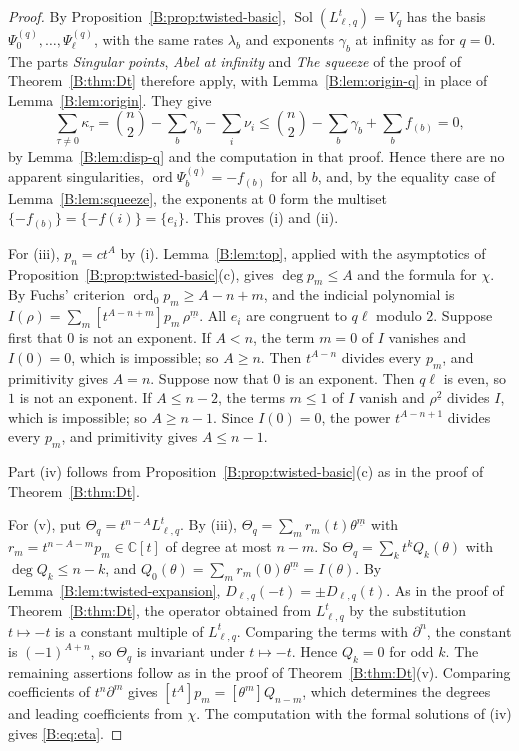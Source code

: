 \documentclass[11pt,a4paper]{article}
\theoremstyle{definition}
\theoremstyle{remark}
\newcommand{\C}{\mathbb C}
\newcommand{\ff}[2]{#1^{\underline{#2}}}
\DeclareMathOperator{\ord}{ord}
\DeclareMathOperator{\Sol}{Sol}
\numberwithin{equation}{section}
\begin{document}
\begin{proof}
By Proposition~\ref{B:prop:twisted-basic}, $\Sol(L^t_{\ell,q})=V_q$ has the basis $\Psi^{(q)}_0,\dots,\Psi^{(q)}_\ell$, with the same rates $\lambda_b$ and exponents $\gamma_b$ at infinity as for $q=0$. The parts \emph{Singular points}, \emph{Abel at infinity} and \emph{The squeeze} of the proof of Theorem~\ref{B:thm:Dt} therefore apply, with Lemma~\ref{B:lem:origin-q} in place of Lemma~\ref{B:lem:origin}. They give
\[
\sum_{\tau\ne0}\kappa_\tau=\binom n2-\sum_b\gamma_b-\sum_i\nu_i\le\binom n2-\sum_b\gamma_b+\sum_bf_{(b)}=0,
\]
by Lemma~\ref{B:lem:disp-q} and the computation in that proof. Hence there are no apparent singularities, $\ord\Psi^{(q)}_b=-f_{(b)}$ for all $b$, and, by the equality case of Lemma~\ref{B:lem:squeeze}, the exponents at $0$ form the multiset $\{-f_{(b)}\}=\{-f(i)\}=\{e_i\}$. This proves (i) and (ii).

For (iii), $p_n=ct^A$ by (i). Lemma~\ref{B:lem:top}, applied with the asymptotics of Proposition~\ref{B:prop:twisted-basic}(c), gives $\deg p_m\le A$ and the formula for $\chi$. By Fuchs' criterion $\ord_0p_m\ge A-n+m$, and the indicial polynomial is $I(\rho)=\sum_m[t^{A-n+m}]p_m\,\ff{\rho}{m}$. All $e_i$ are congruent to $q\ell$ modulo $2$. Suppose first that $0$ is not an exponent. If $A<n$, the term $m=0$ of $I$ vanishes and $I(0)=0$, which is impossible; so $A\ge n$. Then $t^{A-n}$ divides every $p_m$, and primitivity gives $A=n$. Suppose now that $0$ is an exponent. Then $q\ell$ is even, so $1$ is not an exponent. If $A\le n-2$, the terms $m\le1$ of $I$ vanish and $\ff{\rho}{2}$ divides $I$, which is impossible; so $A\ge n-1$. Since $I(0)=0$, the power $t^{A-n+1}$ divides every $p_m$, and primitivity gives $A\le n-1$.

Part (iv) follows from Proposition~\ref{B:prop:twisted-basic}(c) as in the proof of Theorem~\ref{B:thm:Dt}.

For (v), put $\Theta_q=t^{n-A}L^t_{\ell,q}$. By (iii), $\Theta_q=\sum_mr_m(t)\ff{\theta}{m}$ with $r_m=t^{n-A-m}p_m\in\C[t]$ of degree at most $n-m$. So $\Theta_q=\sum_kt^kQ_k(\theta)$ with $\deg Q_k\le n-k$, and $Q_0(\theta)=\sum_mr_m(0)\ff{\theta}{m}=I(\theta)$. By Lemma~\ref{B:lem:twisted-expansion}, $D_{\ell,q}(-t)=\pm D_{\ell,q}(t)$. As in the proof of Theorem~\ref{B:thm:Dt}, the operator obtained from $L^t_{\ell,q}$ by the substitution $t\mapsto-t$ is a constant multiple of $L^t_{\ell,q}$. Comparing the terms with $\partial^n$, the constant is $(-1)^{A+n}$, so $\Theta_q$ is invariant under $t\mapsto-t$. Hence $Q_k=0$ for odd $k$. The remaining assertions follow as in the proof of Theorem~\ref{B:thm:Dt}(v). Comparing coefficients of $t^n\partial^m$ gives $[t^A]p_m=[\theta^m]Q_{n-m}$, which determines the degrees and leading coefficients from $\chi$. The computation with the formal solutions of (iv) gives \eqref{B:eq:eta}.
\end{proof}
\end{document}
